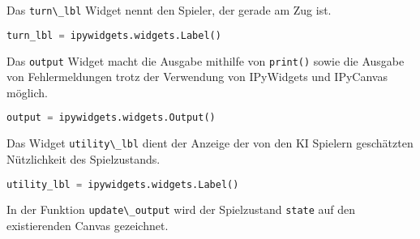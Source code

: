 Das \passthrough{\lstinline!turn\_lbl!} Widget nennt den Spieler, der
gerade am Zug ist.

\begin{lstlisting}[language=Python]
turn_lbl = ipywidgets.widgets.Label()
\end{lstlisting}

Das \passthrough{\lstinline!output!} Widget macht die Ausgabe mithilfe
von \passthrough{\lstinline!print()!} sowie die Ausgabe von
Fehlermeldungen trotz der Verwendung von IPyWidgets und IPyCanvas
möglich.

\begin{lstlisting}[language=Python]
output = ipywidgets.widgets.Output()
\end{lstlisting}

Das Widget \passthrough{\lstinline!utility\_lbl!} dient der Anzeige der
von den \ac{KI} Spielern geschätzten Nützlichkeit des Spielzustands.

\begin{lstlisting}[language=Python]
utility_lbl = ipywidgets.widgets.Label()
\end{lstlisting}

In der Funktion \passthrough{\lstinline!update\_output!} wird der
Spielzustand \passthrough{\lstinline!state!} auf den existierenden
Canvas gezeichnet.


